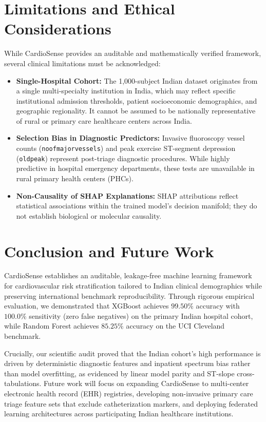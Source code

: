 \documentclass[conference]{IEEEtran}
\begin{document}
\section{Limitations and Ethical Considerations}
While CardioSense provides an auditable and mathematically verified framework, several clinical limitations must be acknowledged:
\begin{itemize}
    \item \textbf{Single-Hospital Cohort:} The 1,000-subject Indian dataset originates from a single multi-specialty institution in India, which may reflect specific institutional admission thresholds, patient socioeconomic demographics, and geographic regionality. It cannot be assumed to be nationally representative of rural or primary care healthcare centers across India.
    \item \textbf{Selection Bias in Diagnostic Predictors:} Invasive fluoroscopy vessel counts (\texttt{noofmajorvessels}) and peak exercise ST-segment depression (\texttt{oldpeak}) represent post-triage diagnostic procedures. While highly predictive in hospital emergency departments, these tests are unavailable in rural primary health centers (PHCs).
    \item \textbf{Non-Causality of SHAP Explanations:} SHAP attributions reflect statistical associations within the trained model's decision manifold; they do not establish biological or molecular causality.
\end{itemize}

\section{Conclusion and Future Work}
CardioSense establishes an auditable, leakage-free machine learning framework for cardiovascular risk stratification tailored to Indian clinical demographics while preserving international benchmark reproducibility. Through rigorous empirical evaluation, we demonstrated that XGBoost achieves $99.50\%$ accuracy with $100.0\%$ sensitivity (zero false negatives) on the primary Indian hospital cohort, while Random Forest achieves $85.25\%$ accuracy on the UCI Cleveland benchmark. 

Crucially, our scientific audit proved that the Indian cohort's high performance is driven by deterministic diagnostic features and inpatient spectrum bias rather than model overfitting, as evidenced by linear model parity and ST-slope cross-tabulations. Future work will focus on expanding CardioSense to multi-center electronic health record (EHR) registries, developing non-invasive primary care triage feature sets that exclude catheterization markers, and deploying federated learning architectures across participating Indian healthcare institutions.
\end{document}
